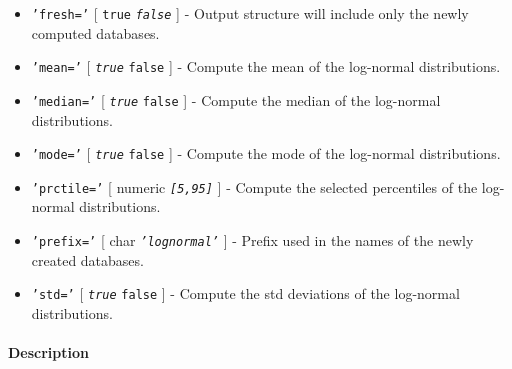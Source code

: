 \begin{itemize}
\item
  \texttt{'fresh='} {[} \texttt{true} \textbar{} \emph{\texttt{false}}
  {]} - Output structure will include only the newly computed databases.
\item
  \texttt{'mean='} {[} \emph{\texttt{true}} \textbar{} \texttt{false}
  {]} - Compute the mean of the log-normal distributions.
\item
  \texttt{'median='} {[} \emph{\texttt{true}} \textbar{} \texttt{false}
  {]} - Compute the median of the log-normal distributions.
\item
  \texttt{'mode='} {[} \emph{\texttt{true}} \textbar{} \texttt{false}
  {]} - Compute the mode of the log-normal distributions.
\item
  \texttt{'prctile='} {[} numeric \textbar{} \emph{\texttt{{[}5,95{]}}}
  {]} - Compute the selected percentiles of the log-normal
  distributions.
\item
  \texttt{'prefix='} {[} char \textbar{} \emph{\texttt{'lognormal'}} {]}
  - Prefix used in the names of the newly created databases.
\item
  \texttt{'std='} {[} \emph{\texttt{true}} \textbar{} \texttt{false} {]}
  - Compute the std deviations of the log-normal distributions.
\end{itemize}

\paragraph{Description}


